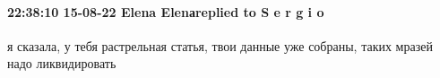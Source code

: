  
 
 
 
 

\paragraph{22:38:10 15-08-22 Elena Elenаreplied to S e r g i o}

я сказала, у тебя растрельная статья, твои данные уже собраны, таких мразей надо ликвидировать
